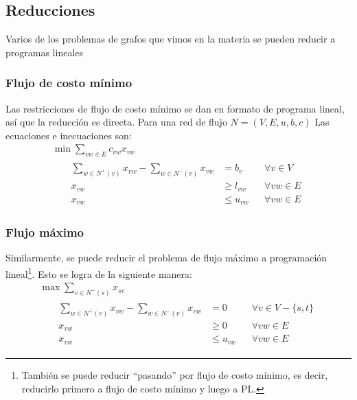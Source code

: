 \documentclass[a4paper]{report}
\begin{document}
\subsection{Reducciones}

Varios de los problemas de grafos que vimos en la materia se pueden reducir a programas lineales

\subsubsection{Flujo de costo mínimo}

Las restricciones de flujo de costo mínimo se dan en formato de programa lineal, así que la reducción es directa. Para una red de flujo $N = (V, E, u, b, c)$ Las ecuaciones e inecuaciones son:
\begin{gather*}
    \min{\sum_{vw \in E} c_{vw} x_{vw}} \\
    \begin{flalign*}
         &  & \sum_{w \in N^+(v)} x_{vw} - \sum_{w \in N^-(v)} x_{vw} & = b_v       &  & \forall v \in V  \\
         &  & x_{vw}                                                  & \geq l_{vw} &  & \forall vw \in E \\
         &  & x_{vw}                                                  & \leq u_{vw} &  & \forall vw \in E
    \end{flalign*}
\end{gather*}

\subsubsection{Flujo máximo}

Similarmente, se puede reducir el problema de flujo máximo a programación lineal\footnote{También se puede reducir ``pasando'' por flujo de costo mínimo, es decir, reducirlo primero a flujo de costo mínimo y luego a PL.}. Esto se logra de la siguiente manera:
\begin{gather*}
    \max{\sum_{v \in N^+(s)} x_{sv}} \\
    \begin{flalign*}
         &  & \sum_{w \in N^+(v)} x_{vw} - \sum_{w \in N^-(v)} x_{vw} & = 0         &  & \forall v \in V - \{s, t\} \\
         &  & x_{vw}                                                  & \geq 0      &  & \forall vw \in E           \\
         &  & x_{vw}                                                  & \leq u_{vw} &  & \forall vw \in E
    \end{flalign*}
\end{gather*}
\end{document}
